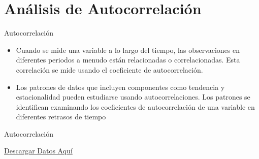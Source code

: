 \section{Análisis de Autocorrelación}
\label{sec:autocorrelation}

\begin{frame}{Autocorrelación}
  
  \begin{itemize}\justifying \parskip3mm
  \item Cuando se mide una variable a lo largo del tiempo, las observaciones en diferentes periodos \alert{a
menudo están relacionadas o correlacionadas}. Esta correlación se mide usando el coeficiente
de autocorrelación.
  \item Los patrones de datos que incluyen componentes como \alert{tendencia y estacionalidad pueden
estudiarse usando autocorrelaciones}. Los patrones se identifican examinando los coeficientes
de autocorrelación de una variable en diferentes retrasos de tiempo
  \end{itemize}


\end{frame}

\begin{frame}{Autocorrelación}

  \href{https://drive.google.com/uc?id=1PODZqwPsaIsQ1M0-XMtr1J2GfSapaeV5&export=download}{Descargar Datos Aquí}  
  
  \begin{table}[!ht]
    \caption{Datos de ejemplo para autocorrelación}
    \centering
\end{table}
\end{frame}

